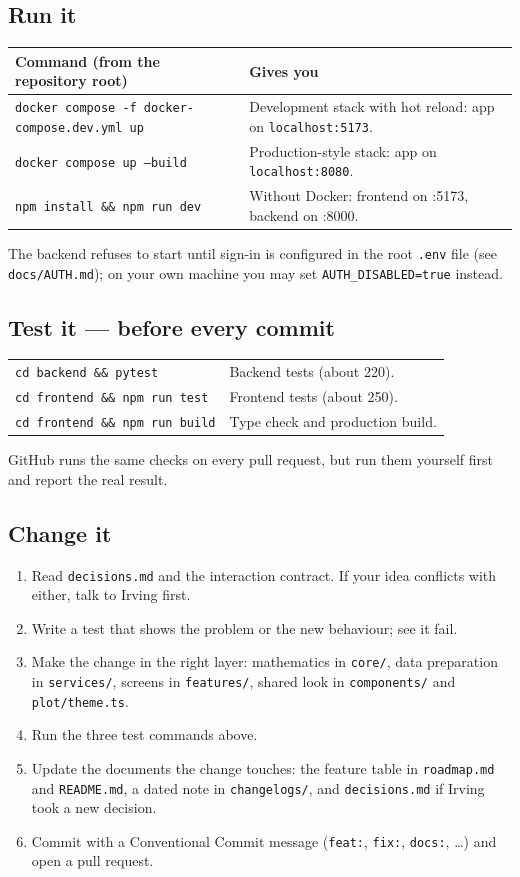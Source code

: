 \documentclass[11pt,a4paper]{article}
\newcommand{\f}[1]{\texttt{#1}}
\begin{document}
\subsection{Run it}
\begin{tabularx}{\textwidth}{@{}>{\raggedright\arraybackslash}p{7.6cm}L@{}}
\toprule
\textbf{Command (from the repository root)} & \textbf{Gives you} \\
\midrule
\f{docker compose -f docker-compose.dev.yml up} & Development stack with hot reload: app on \f{localhost:5173}. \\
\f{docker compose up --build} & Production-style stack: app on \f{localhost:8080}. \\
\f{npm install \&\& npm run dev} & Without Docker: frontend on :5173, backend on :8000. \\
\bottomrule
\end{tabularx}

The backend refuses to start until sign-in is configured in the root \f{.env} file (see \f{docs/AUTH.md}); on
your own machine you may set \f{AUTH\_DISABLED=true} instead.

\subsection{Test it — before every commit}
\begin{tabularx}{\textwidth}{@{}>{\raggedright\arraybackslash}p{6.4cm}L@{}}
\toprule
\f{cd backend \&\& pytest} & Backend tests (about 220). \\
\f{cd frontend \&\& npm run test} & Frontend tests (about 250). \\
\f{cd frontend \&\& npm run build} & Type check and production build. \\
\bottomrule
\end{tabularx}

GitHub runs the same checks on every pull request, but run them yourself first and report the real result.

\subsection{Change it}
\begin{enumerate}
\item Read \f{decisions.md} and the interaction contract. If your idea conflicts with either, talk to Irving
  first.
\item Write a test that shows the problem or the new behaviour; see it fail.
\item Make the change in the right layer: mathematics in \f{core/}, data preparation in \f{services/},
  screens in \f{features/}, shared look in \f{components/} and \f{plot/theme.ts}.
\item Run the three test commands above.
\item Update the documents the change touches: the feature table in \f{roadmap.md} and \f{README.md}, a dated
  note in \f{changelogs/}, and \f{decisions.md} if Irving took a new decision.
\item Commit with a Conventional Commit message (\f{feat:}, \f{fix:}, \f{docs:}, …) and open a pull request.
\end{enumerate}
\end{document}
